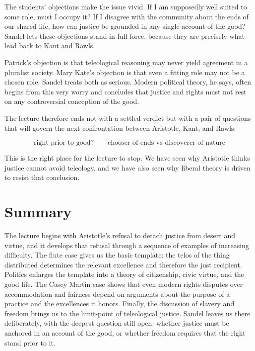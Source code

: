 The students' objections make the issue vivid. If I am supposedly well suited to some role, must I occupy it? If I disagree with the community about the ends of our shared life, how can justice be grounded in any single account of the good? Sandel lets these objections stand in full force, because they are precisely what lead back to Kant and Rawls.

Patrick's objection is that teleological reasoning may never yield agreement in a pluralist society. Mary Kate's objection is that even a fitting role may not be a chosen role. Sandel treats both as serious. Modern political theory, he says, often begins from this very worry and concludes that justice and rights must not rest on any controversial conception of the good.

The lecture therefore ends not with a settled verdict but with a pair of questions that will govern the next confrontation between Aristotle, Kant, and Rawls:

\begin{equation}
\text{right prior to good?}
\qquad
\text{chooser of ends vs discoverer of nature}
\end{equation}

This is the right place for the lecture to stop. We have seen why Aristotle thinks justice cannot avoid teleology, and we have also seen why liberal theory is driven to resist that conclusion.

\section{Summary}

The lecture begins with Aristotle's refusal to detach justice from desert and virtue, and it develops that refusal through a sequence of examples of increasing difficulty. The flute case gives us the basic template: the telos of the thing distributed determines the relevant excellence and therefore the just recipient. Politics enlarges the template into a theory of citizenship, civic virtue, and the good life. The Casey Martin case shows that even modern rights disputes over accommodation and fairness depend on arguments about the purpose of a practice and the excellences it honors. Finally, the discussion of slavery and freedom brings us to the limit-point of teleological justice. Sandel leaves us there deliberately, with the deepest question still open: whether justice must be anchored in an account of the good, or whether freedom requires that the right stand prior to it.